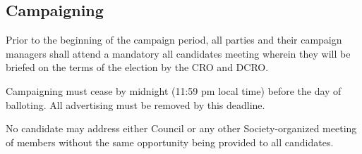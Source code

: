 \subsection{Campaigning}
\begin{longenum}[ label*=\thesubsection.\arabic*., align=left]
    \item Prior to the beginning of the campaign period, all parties and their campaign
managers shall attend a mandatory all candidates meeting wherein they will be briefed on the terms of the election by the CRO and DCRO.
    \item Campaigning must cease by midnight (11:59 pm local time) before the day of balloting. All advertising must be removed by this deadline. 
    \item No candidate may address either Council or any other Society-organized meeting of members without the same opportunity being provided to all candidates.
\end{longenum}
